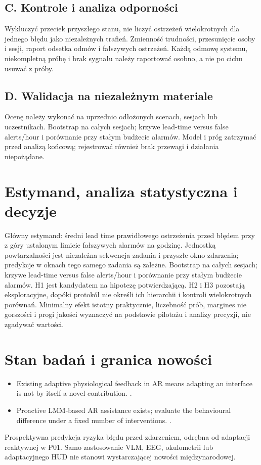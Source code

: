 \documentclass[11pt,a4paper]{article}
\begin{document}
\subsection{C. Kontrole i analiza odporności}
Wykluczyć przeciek przyszłego stanu, nie liczyć ostrzeżeń wielokrotnych dla jednego błędu jako niezależnych trafień. Zmienność trudności, przesunięcie osoby i sesji, raport odsetka odmów i fałszywych ostrzeżeń. Każdą odmowę systemu, niekompletną próbę i brak sygnału należy raportować osobno, a nie po cichu usuwać z próby.

\subsection{D. Walidacja na niezależnym materiale}
Ocenę należy wykonać na uprzednio odłożonych scenach, sesjach lub uczestnikach. Bootstrap na całych sesjach; krzywe lead-time versus false alerts/hour i porównanie przy stałym budżecie alarmów. Model i próg zatrzymać przed analizą końcową; rejestrować również brak przewagi i działania niepożądane.

\section{Estymand, analiza statystyczna i decyzje}
Główny estymand: średni lead time prawidłowego ostrzeżenia przed błędem przy z góry ustalonym limicie fałszywych alarmów na godzinę. Jednostką powtarzalności jest niezależna sekwencja zadania i przyszłe okno zdarzenia; predykcje w oknach tego samego zadania są zależne. Bootstrap na całych sesjach; krzywe lead-time versus false alerts/hour i porównanie przy stałym budżecie alarmów. H1 jest kandydatem na hipotezę potwierdzającą. H2 i H3 pozostają eksploracyjne, dopóki protokół nie określi ich hierarchii i kontroli wielokrotnych porównań. Minimalny efekt istotny praktycznie, liczebność prób, margines nie gorszości i progi jakości wyznaczyć na podstawie pilotażu i analizy precyzji, nie zgadywać wartości.

\section{Stan badań i granica nowości}
\begin{itemize}
\item Existing adaptive physiological feedback in AR means adapting an interface is not by itself a novel contribution. \cite{xrprior1}.
\item Proactive LMM-based AR assistance exists; evaluate the behavioural difference under a fixed number of interventions. \cite{xrprior2}.
\end{itemize}
Prospektywna predykcja ryzyka błędu przed zdarzeniem, odrębna od adaptacji reaktywnej w P01. Samo zastosowanie VLM, EEG, okulometrii lub adaptacyjnego HUD nie stanowi wystarczającej nowości międzynarodowej.
\end{document}
